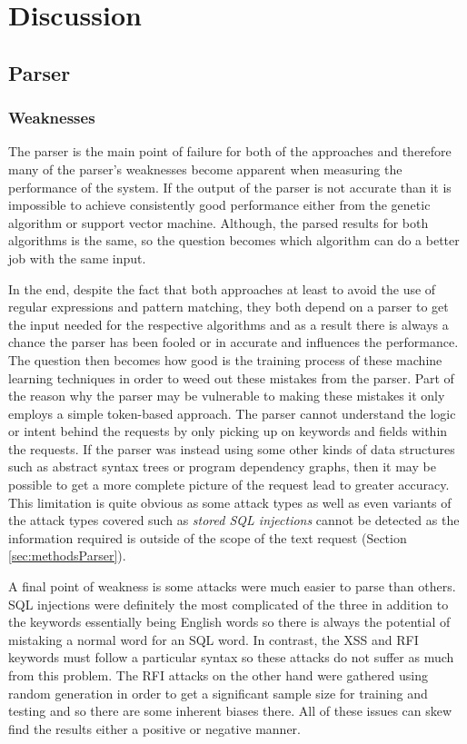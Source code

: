 \chapter{Discussion} \label{sec:sectionSeven}

\section{Parser}
\subsection{Weaknesses}\label{sec:parseWeak}

The parser is the main point of failure for both of the approaches and therefore many of the parser's weaknesses become apparent when measuring the performance of the system.  If the output of the parser is not accurate than it is impossible to achieve consistently good performance either from the genetic algorithm or support vector machine. Although, the parsed results for both algorithms is the same, so the question becomes which algorithm can do a better job with the same input.

In the end, despite the fact that both approaches at least to avoid the use of regular expressions and pattern matching, they both depend on a parser to get the input needed for the respective algorithms and as a result there is always a chance the parser has been fooled or in accurate and influences the performance.  The question then becomes how good is the training process of these machine learning techniques in order to weed out these mistakes from the parser.  Part of the reason why the parser may be vulnerable to making these mistakes it only employs a simple token-based approach.  The parser cannot understand the logic or intent behind the requests by only picking up on keywords and fields within the requests.  If the parser was instead using some other kinds of data structures such as abstract syntax trees or program dependency graphs, then it may be possible to get a more complete picture of the request lead to greater accuracy.  This limitation is quite obvious as some attack types as well as even variants of the attack types covered such as \textit{stored SQL injections} cannot be detected as the information required is outside of the scope of the text request (Section \ref{sec:methodsParser}).

A final point of weakness is some attacks were much easier to parse than others.  SQL injections were definitely the most complicated of the three in addition to the keywords essentially being English words so there is always the potential of mistaking a normal word for an SQL word.  In contrast, the XSS and RFI keywords must follow a particular syntax so these attacks do not suffer as much from this problem.  The RFI attacks on the other hand were gathered using random generation in order to get a significant sample size for training and testing and so there are some inherent biases there.  All of these issues can skew find the results either a positive or negative manner.

